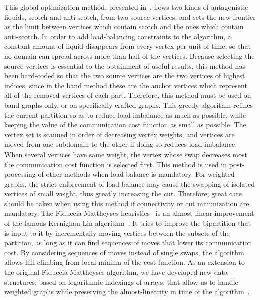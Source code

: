 \begin{itemize}
This global optimization method, presented in~\cite{pell07b}, flows two
kinds of antagonistic liquids, scotch and anti-scotch, from two source
vertices, and sets the new frontier as the limit between vertices
which contain scotch and the ones which contain anti-scotch. In order
to add load-balancing constraints to the algorithm, a constant amount
of liquid disappears from every vertex per unit of time, so that no
domain can spread across more than half of the vertices. Because
selecting the source vertices is essential to the obtainment of useful
results, this method has been hard-coded so that the two source
vertices are the two vertices of highest indices, since in the band
method these are the anchor vertices which represent all of the removed
vertices of each part. Therefore, this method must be used on band
graphs only, or on specifically crafted graphs.
This greedy algorithm refines the current partition so as to reduce load
imbalance as much as possible, while keeping the value of the communication
cost function as small as possible.
The vertex set is scanned in order of decreasing vertex weights, and vertices
are moved from one subdomain to the other if doing so reduces load imbalance.
When several vertices have same weight, the vertex whose swap
decreases most the communication cost function is selected first.
This method is used in post-processing of other methods when load balance is
mandatory. For weighted graphs, the strict enforcement of load balance may
cause the swapping of isolated vertices of small weight, thus greatly
increasing the cut. Therefore, great care should be taken when using this
method if connectivity or cut minimization are mandatory.
\label{sec-algo-fme}
The Fiduccia-Mattheyses heuristics~\cite{fima82} is an almost-linear
improvement of the famous Kernighan-Lin algorithm~\cite{keli70}.
It tries to improve the bipartition that is input to it
by incrementally moving vertices between the subsets of the partition,
as long as it can find sequences of moves that lower its communication cost.
By considering sequences of moves instead of single swaps,
the algorithm allows hill-climbing from local minima of the cost function.
As an extension to the original Fiduccia-Mattheyses algorithm,
we have developed new data structures, based on logarithmic indexings of
arrays, that allow us to handle weighted graphs while preserving the
almost-linearity in time of the algorithm~\cite{pero96b}.


\end{itemize}
